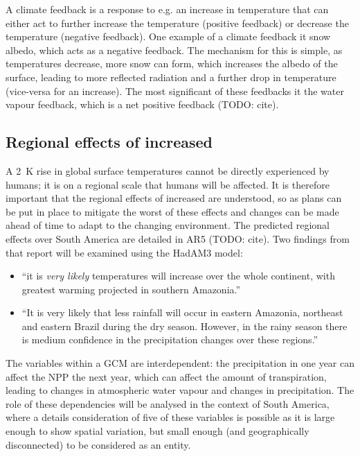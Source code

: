 \documentclass{article}
\begin{document}
A climate feedback is a response to e.g. an increase in temperature that can either act to further increase the temperature (positive feedback) or decrease the temperature (negative feedback). One example of a climate feedback it snow albedo, which acts as a negative feedback. The mechanism for this is simple, as temperatures decrease, more snow can form, which increases the albedo of the surface, leading to more reflected radiation and a further drop in temperature (vice-versa for an increase). The most significant of these feedbacks it the water vapour feedback, which is a net positive feedback (TODO: cite).

\subsection{Regional effects of increased }
A \SI{2}{K} rise in global surface temperatures cannot be directly experienced by humans; it is on a regional scale that humans will be affected. It is therefore important that the regional effects of increased  are understood, so as plans can be put in place to mitigate the worst of these effects and changes can be made ahead of time to adapt to the changing environment. The predicted regional effects over South America are detailed in AR5 (TODO: cite). Two findings from that report will be examined using the HadAM3 model:
\begin{itemize}
    \item ``it is \textit{very likely} temperatures will increase over the whole continent, with greatest warming projected in southern Amazonia.''
    \item ``It is very likely that less rainfall will occur in eastern Amazonia, northeast and eastern Brazil during the dry season. However, in the rainy season there is medium confidence in the precipitation changes over these regions.''
\end{itemize}

The variables within a GCM are interdependent: the precipitation in one year can affect the NPP the next year, which can affect the amount of transpiration, leading to changes in atmospheric water vapour and changes in precipitation. The role of these dependencies will be analysed in the context of South America, where a details consideration of five of these variables is possible as it is large enough to show spatial variation, but small enough (and geographically disconnected) to be considered as an entity.
\end{document}
